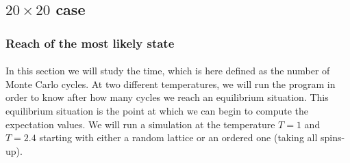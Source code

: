 \documentclass[a4paper, twoside, 11pt]{report}
\theoremstyle{theorem}
\theoremstyle{remark}
\theoremstyle{exemple}
\begin{document}
            
        \subsection{$20\times20$ case}
        
            \subsubsection{Reach of the most likely state}
            
                \paragraph{}In this section we will study the time, which is here defined as the number of Monte Carlo cycles. At two different temperatures, we will run the program in order to know after how many cycles we reach an equilibrium situation. This equilibrium situation is the point at which we can begin to compute the expectation values. We will run a simulation at the temperature $T=1$ and $T=2.4$ starting with either a random lattice or an ordered one (taking all spins-up).
            
\end{document}
